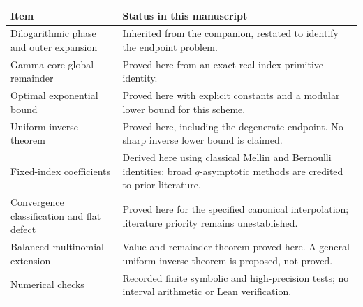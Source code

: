 \documentclass[11pt,a4paper]{article}
\numberwithin{equation}{section}
\theoremstyle{definition}
\begin{document}
\begin{center}\small
\begin{tabular}{@{}p{.29\linewidth}p{.64\linewidth}@{}}\toprule
Item&Status in this manuscript\\\midrule
Dilogarithmic phase and outer expansion&Inherited from the companion, restated to identify the endpoint problem.\\
Gamma-core global remainder&Proved here from an exact real-index primitive identity.\\
Optimal exponential bound&Proved here with explicit constants and a modular lower bound for this scheme.\\
Uniform inverse theorem&Proved here, including the degenerate endpoint. No sharp inverse lower bound is claimed.\\
Fixed-index coefficients&Derived here using classical Mellin and Bernoulli identities; broad $q$-asymptotic methods are credited to prior literature.\\
Convergence classification and flat defect&Proved here for the specified canonical interpolation; literature priority remains unestablished.\\
Balanced multinomial extension&Value and remainder theorem proved here. A general uniform inverse theorem is proposed, not proved.\\
Numerical checks&Recorded finite symbolic and high-precision tests; no interval arithmetic or Lean verification.\\\bottomrule
\end{tabular}
\end{center}
\end{document}

